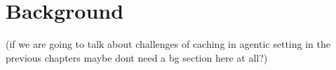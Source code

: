 \section{Background}
\label{sec:ch3_bg}

(if we are going to talk about challenges of caching in agentic setting in the previous chapters maybe dont need a bg section here at all?)